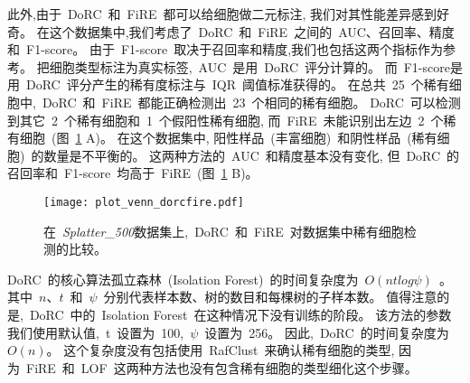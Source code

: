 此外,由于~DoRC~和~FiRE~都可以给细胞做二元标注,
我们对其性能差异感到好奇。
在这个数据集中,我们考虑了~DoRC~和~FiRE~之间的~AUC、召回率、精度和~F1-score。
由于~F1-score~取决于召回率和精度,我们也包括这两个指标作为参考。
把细胞类型标注为真实标签,~AUC~是用~DoRC~评分计算的。
而~F1-score是用~DoRC~评分产生的稀有度标注与~IQR~阈值标准获得的。
在总共~25~个稀有细胞中,~DoRC~和~FiRE~都能正确检测出~23~个相同的稀有细胞。
DoRC~可以检测到其它~2~个稀有细胞和~1~个假阳性稀有细胞,
而~FiRE~未能识别出左边~2~个稀有细胞~(图~\ref{fig:simulate:venn_auc_f1} A)。
在这个数据集中, 阳性样品~(丰富细胞)~和阴性样品~(稀有细胞)~的数量是不平衡的。
这两种方法的~AUC~和精度基本没有变化,
但~DoRC~的召回率和~F1-score~均高于~FiRE~(图~\ref{fig:simulate:venn_auc_f1} B)。
\begin{figure}[!htbp]
    \centering
    \texttt{[image: plot\_venn\_dorcfire.pdf]}
    \caption{
    在~\textit{Splatter\_500}数据集上,~DoRC~和~FiRE~对数据集中稀有细胞检测的比较。
    }
    \label{fig:simulate:venn_auc_f1}
\end{figure}


DoRC~的核心算法孤立森林~(Isolation Forest)~的时间复杂度为~$O(ntlog\psi)$~\cite{liu2008isolation}。
其中~$n$、$t$~和~$\psi$~分别代表样本数、树的数目和每棵树的子样本数。
值得注意的是,~DoRC~中的~Isolation Forest~在这种情况下没有训练的阶段。
该方法的参数我们使用默认值,~t~设置为~100,~$\psi$~设置为~256。
因此,~DoRC~的时间复杂度为~$O(n)$。
这个复杂度没有包括使用~RafClust~来确认稀有细胞的类型,
因为~FiRE~和~LOF~这两种方法也没有包含稀有细胞的类型细化这个步骤。

